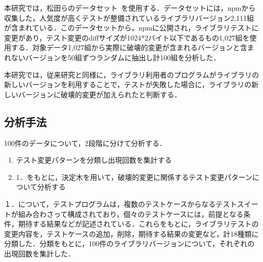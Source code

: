 \documentclass[uplatex,dvipdfmx,a4paper,twocolumn,base=11pt,jbase=11pt,ja=standard]{bxjsarticle}  %
\begin{document}
本研究では，松田らのデータセット~\cite{FOSE2021_Matsuda}を使用する．データセットには，npmから収集した，人気度が高くテストが整備されているライブラリバージョン2,111組が含まれている．このデータセットから，npmに公開され，ライブラリテストに変更があり，テスト変更のdiffサイズが1024*2バイト以下であるもの1,027組を使用する．対象データ1,027組から実際に破壊的変更が含まれるバージョンと含まれないバージョンを50組ずつランダムに抽出し計100組を分析した．


本研究では，従来研究と同様に，ライブラリ利用者のプログラムがライブラリの新しいバージョンを利用することで，テストが失敗した場合に，ライブラリの新しいバージョンに破壊的変更が加えられたと判断する．

\subsection{分析手法}

100件のデータについて，2段階に分けて分析する．
\vspace{-2mm}
\begin{enumerate}
 \item テスト変更パターンを分類し出現回数を集計する
 \item 1．をもとに，決定木を用いて，破壊的変更に関係するテスト変更パターンについて分析する
\end{enumerate}

１．について，テストプログラムは，複数のテストケースからなるテストスイートが組み合わさって構成されており，個々のテストケースには，前提となる条件，期待する結果などが記述されている．これらをもとに，ライブラリテストの変更内容を，テストケースの追加，削除，期待する結果の変更など，計18種類に分類した．分類をもとに，100件のライブラリバージョンについて，それぞれの出現回数を集計した．
\end{document}
